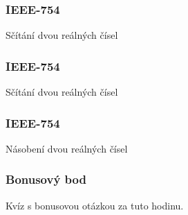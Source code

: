 \documentclass{beamer}
\begin{document}
\begin{frame}
\frametitle{IEEE-754}

Sčítání dvou reálných čísel

\end{frame}


\begin{frame}
\frametitle{IEEE-754}

Sčítání dvou reálných čísel

\end{frame}

\begin{frame}
\frametitle{IEEE-754}

Násobení dvou reálných čísel

\end{frame}

\begin{frame}
\frametitle{Bonusový bod}

Kvíz s bonusovou otázkou za tuto hodinu.

\end{frame}
\end{document}
